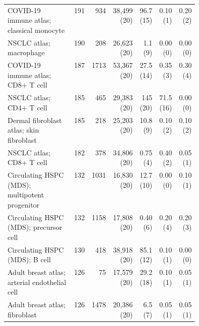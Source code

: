 \begin{table}[h]
\begin{tabular}{@{}p{0.44\linewidth}rrrrrr@{}}
COVID-19 immune atlas; classical monocyte & 191 & 934 & 38{,}499 (20) & 96.7 (15) & 0.10 (1) & 0.20 (2)\\
NSCLC atlas; macrophage & 190 & 208 & 26{,}623 (20) & 1.1 (9) & 0.00 (0) & 0.00 (0)\\
COVID-19 immune atlas; CD8+ T cell & 187 & 1713 & 53{,}367 (20) & 27.5 (14) & 0.35 (3) & 0.30 (4)\\
NSCLC atlas; CD4+ T cell & 185 & 465 & 29{,}383 (20) & 145 (20) & 71.5 (16) & 0.00 (0)\\
Dermal fibroblast atlas; skin fibroblast & 185 & 218 & 25{,}203 (20) & 10.8 (9) & 0.10 (2) & 0.10 (2)\\
NSCLC atlas; CD8+ T cell & 182 & 378 & 34{,}806 (20) & 0.75 (4) & 0.40 (2) & 0.05 (1)\\
Circulating HSPC (MDS); multipotent progenitor & 132 & 1031 & 16{,}830 (20) & 12.7 (10) & 0.00 (0) & 0.10 (1)\\
Circulating HSPC (MDS); precursor cell & 132 & 1158 & 17{,}808 (20) & 0.40 (6) & 0.20 (4) & 0.20 (3)\\
Circulating HSPC (MDS); B cell & 130 & 418 & 38{,}918 (20) & 85.1 (12) & 0.10 (1) & 0.00 (0)\\
Adult breast atlas; arterial endothelial cell & 126 & 75 & 17{,}579 (20) & 29.2 (18) & 0.10 (1) & 0.05 (1)\\
Adult breast atlas; fibroblast & 126 & 1478 & 20{,}386 (20) & 6.5 (7) & 0.05 (1) & 0.05 (1)\\
\bottomrule
\end{tabular}\end{table}
